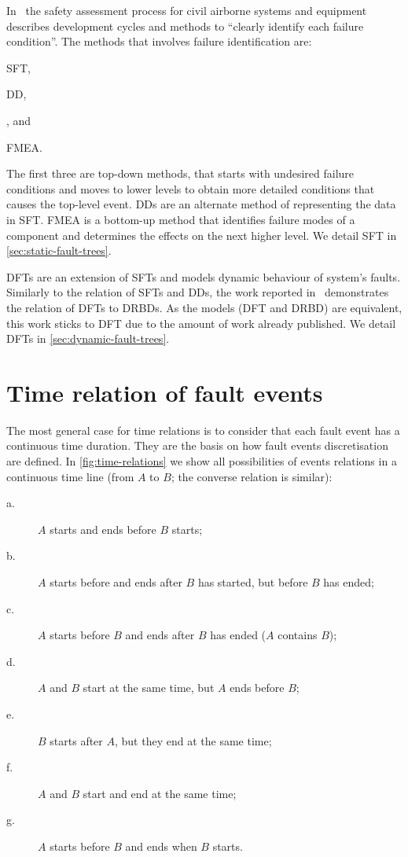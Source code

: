 \documentclass[12pt,openright,twoside,a4paper,oldfontcommands,english,brazil,draft]{abntex2}
\theoremstyle{theo}
\begin{document}
In~\cite{SAE1996b} the safety assessment process for civil airborne systems and equipment describes development cycles and methods to ``clearly identify each failure condition''.
The methods that involves failure identification are:
\begin{alineasinline}
  \item \ac{SFT},
  \item \ac{DD},
  \item {}, and
  \item \ac{FMEA}.
\end{alineasinline}
The first three are top-down methods, that starts with undesired failure conditions and moves to lower levels to obtain more detailed conditions that causes the top-level event.
\Acp{DD} are an alternate method of representing the data in \ac{SFT}.
\Ac{FMEA} is a bottom-up method that identifies failure modes of a component and determines the effects on the next higher level.
We detail \ac{SFT} in \cref{sec:static-fault-trees}.

\Acp{DFT} are an extension of \acp{SFT} and models dynamic behaviour of system's faults.
Similarly to the relation of \acp{SFT} and \acp{DD}, the work reported in~\cite{DP2009} demonstrates the relation of \acp{DFT} to \acp{DRBD}.
As the models (\ac{DFT} and \ac{DRBD}) are equivalent, this work sticks to \ac{DFT} due to the amount of work already published.
We detail \acp{DFT} in \cref{sec:dynamic-fault-trees}.

\section{Time relation of fault events}
\label{sec:time-relations}

The most general case for time relations is to consider that each fault event has a continuous time duration.
They are the basis on how fault events discretisation are defined.
In \cref{fig:time-relations} we show all possibilities of events relations in a continuous time line (from $A$ to $B$; the converse relation is similar):

\begin{description}
  \item[a.] $A$ starts and ends before $B$ starts;
  \item[b.] $A$ starts before and ends after $B$ has started, but before $B$ has ended;
  \item[c.] $A$ starts before $B$ and ends after $B$ has ended ($A$ contains $B$);
  \item[d.] $A$ and $B$ start at the same time, but $A$ ends before $B$;
  \item[e.] $B$ starts after $A$, but they end at the same time;
  \item[f.] $A$ and $B$ start and end at the same time;
  \item[g.] $A$ starts before $B$ and ends when $B$ starts.
\end{description}
\end{document}
